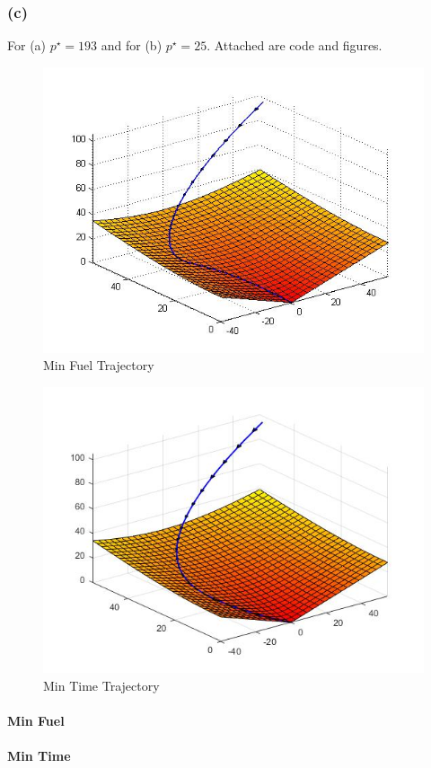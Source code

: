 \subsubsection*{(c)}
For (a) $p^{\star} =193$ and for (b) $p^{\star}=25$. Attached are code and figures.
\begin{figure}
	\centering
	\includegraphics[scale=0.7]{trag}
	\caption{Min Fuel Trajectory}
\end{figure}
\begin{figure}
	\centering
	\includegraphics[scale=0.7]{trag2}
	\caption{Min Time Trajectory}
\end{figure}
\paragraph{Min Fuel}

\paragraph{Min Time}

